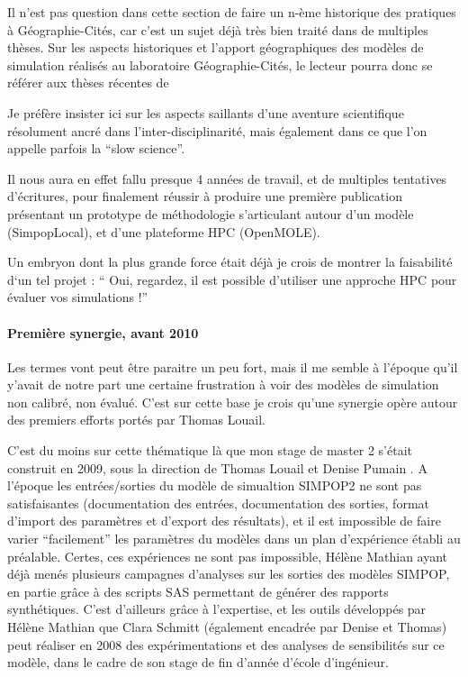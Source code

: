 Il n'est pas question dans cette section de faire un n-ème historique des pratiques à Géographie-Cités, car c'est un sujet déjà très bien traité dans de multiples thèses. Sur les aspects historiques et l'apport géographiques des modèles de simulation réalisés au laboratoire Géographie-Cités, le lecteur pourra donc se référer aux thèses récentes de \autocites{Glisse, Louail2010, Schmitt2014, Cottineau2014b}

Je préfère insister ici sur les aspects saillants d'une aventure scientifique résolument ancré dans l'inter-disciplinarité, mais également dans ce que l'on appelle parfois la \foreignquote{english}{slow science}.

Il nous aura en effet fallu presque 4 années de travail, et de multiples tentatives d'écritures, pour finalement réussir à produire une première publication \autocite{Schmitt2015} présentant un prototype de méthodologie s'articulant autour d'un modèle (SimpopLocal), et d'une plateforme HPC (OpenMOLE).

Un embryon dont la plus grande force était déjà je crois de montrer la faisabilité d`un tel projet : \enquote{ Oui, regardez, il est possible d'utiliser une approche HPC pour évaluer vos simulations !}



\paragraph{Première synergie, avant 2010}

Les termes vont peut être paraitre un peu fort, mais il me semble à l'époque qu'il y'avait de notre part une certaine frustration à voir des modèles de simulation non calibré, non évalué. C'est sur cette base je crois qu'une synergie opère autour des premiers efforts portés par Thomas Louail.

C'est du moins sur cette thématique là que mon stage de master 2 s'était construit en 2009, sous la direction de Thomas Louail et Denise Pumain \autocite{Rey2009}. A l'époque les entrées/sorties du modèle de simualtion SIMPOP2 ne sont pas satisfaisantes (documentation des entrées, documentation des sorties, format d'import des paramètres et d'export des résultats), et il est impossible de faire varier \enquote{facilement} les paramètres du modèles dans un plan d'expérience établi au préalable. Certes, ces expériences ne sont pas impossible, Hélène Mathian ayant déjà menés plusieurs campagnes d'analyses sur les sorties des modèles SIMPOP, en partie grâce à des scripts SAS permettant de générer des rapports synthétiques. C'est d'ailleurs grâce à l'expertise, et les outils développés par Hélène Mathian que Clara Schmitt (également encadrée par Denise et Thomas) \autocite{Schmitt2008} peut réaliser en 2008 des expérimentations et des analyses de sensibilités sur ce modèle, dans le cadre de son stage de fin d'année d'école d'ingénieur.

